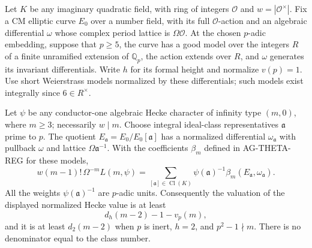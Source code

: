 \begin{proposition}
Let $K$ be any imaginary quadratic field, with ring of integers
$\mathcal O$ and $w=|\mathcal O^\times|$. Fix a CM elliptic curve
$E_0$ over a number field, with its full $\mathcal O$-action and an
algebraic differential $\omega$ whose complex period lattice is
$\Omega\mathcal O$. At the chosen $p$-adic embedding, suppose that
$p\ge5$, the curve has a good model over the integers $R$ of a
finite unramified extension of $\mathbb Q_p$, the action extends
over $R$, and $\omega$ generates its invariant differentials.
Write $h$ for its formal height and normalize $v(p)=1$.
Use short Weierstrass models normalized by these differentials;
such models exist integrally since $6\in R^\times$.

Let $\psi$ be any conductor-one algebraic Hecke character of
infinity type $(m,0)$, where $m\ge3$; necessarily $w\mid m$.
Choose integral ideal-class representatives $\mathfrak a$ prime
to $p$. The quotient $E_{\mathfrak a}=E_0/E_0[\mathfrak a]$ has
a normalized differential $\omega_{\mathfrak a}$ with pullback
$\omega$ and lattice $\Omega\mathfrak a^{-1}$. With the
coefficients $\beta_m$ defined in AG-THETA-REG for these models,
\begin{equation}\label{eq:ag-cm-class-sum}
 w(m-1)!\,\Omega^{-m}L(m,\psi)
   =\sum_{[\mathfrak a]\in\operatorname{Cl}(K)}
      \psi(\mathfrak a)^{-1}
      \beta_m(E_{\mathfrak a},\omega_{\mathfrak a}).
\end{equation}
All the weights $\psi(\mathfrak a)^{-1}$ are $p$-adic units.
Consequently the valuation of the displayed normalized Hecke
value is at least
\[
 d_h(m-2)-1-v_p(m),
\]
and it is at least $d_2(m-2)$ when $p$ is inert, $h=2$, and
$p^2-1\nmid m$. There is no denominator equal to the class number.
\end{proposition}
